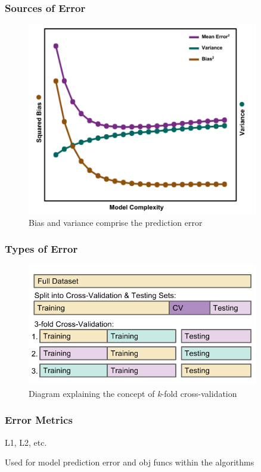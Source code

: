 
\begin{frame}
  \frametitle{Sources of Error}
  \begin{figure}[h!]
    \centering
    \includegraphics[width=0.9\textwidth]{./figures/BVtradeoff.png}
    \caption{Bias and variance comprise the prediction error}
  \end{figure}
\end{frame}

\begin{frame}
  \frametitle{Types of Error}
  \begin{figure}[h!]
    \centering
    \includegraphics[width=0.9\textwidth]{./figures/cverror.png}
    \caption{Diagram explaining the concept of \textit{k}-fold cross-validation}
  \end{figure}
\end{frame}

\begin{frame}
  \frametitle{Error Metrics}
  L1, L2, etc. 

  Used for model prediction error and obj funcs within the algorithms
\end{frame}

